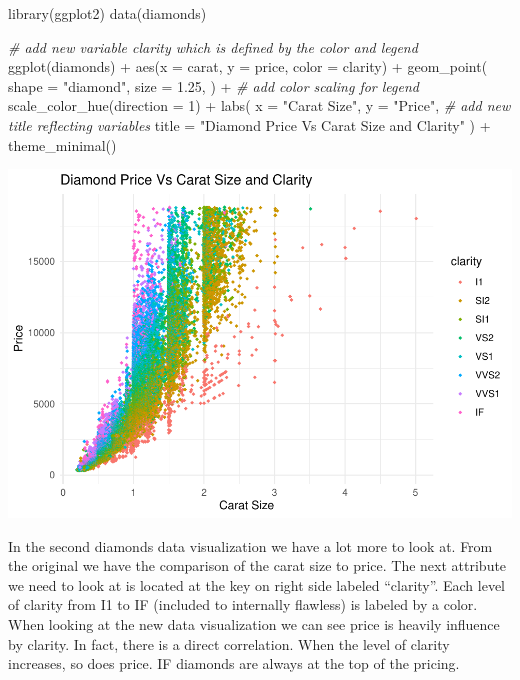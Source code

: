 \documentclass[
]{article}
\newenvironment{Shaded}{\begin{snugshade}}{\end{snugshade}}
\newcommand{\AttributeTok}[1]{\textcolor[rgb]{0.77,0.63,0.00}{#1}}
\newcommand{\CommentTok}[1]{\textcolor[rgb]{0.56,0.35,0.01}{\textit{#1}}}
\newcommand{\DecValTok}[1]{\textcolor[rgb]{0.00,0.00,0.81}{#1}}
\newcommand{\FloatTok}[1]{\textcolor[rgb]{0.00,0.00,0.81}{#1}}
\newcommand{\FunctionTok}[1]{\textcolor[rgb]{0.00,0.00,0.00}{#1}}
\newcommand{\NormalTok}[1]{#1}
\newcommand{\SpecialCharTok}[1]{\textcolor[rgb]{0.00,0.00,0.00}{#1}}
\newcommand{\StringTok}[1]{\textcolor[rgb]{0.31,0.60,0.02}{#1}}
\begin{document}
\begin{Shaded}
\begin{Highlighting}[]
\FunctionTok{library}\NormalTok{(ggplot2)}
\FunctionTok{data}\NormalTok{(diamonds)}

\CommentTok{\# add new variable \textquotesingle{}clarity\textquotesingle{} which is defined by the color and legend}
\FunctionTok{ggplot}\NormalTok{(diamonds) }\SpecialCharTok{+}
  \FunctionTok{aes}\NormalTok{(}\AttributeTok{x =}\NormalTok{ carat, }\AttributeTok{y =}\NormalTok{ price, }\AttributeTok{color =}\NormalTok{ clarity) }\SpecialCharTok{+}
  \FunctionTok{geom\_point}\NormalTok{(}
    \AttributeTok{shape =} \StringTok{"diamond"}\NormalTok{,}
    \AttributeTok{size =} \FloatTok{1.25}\NormalTok{,}
\NormalTok{  ) }\SpecialCharTok{+} 
  \CommentTok{\# add color scaling for legend }
  \FunctionTok{scale\_color\_hue}\NormalTok{(}\AttributeTok{direction =} \DecValTok{1}\NormalTok{) }\SpecialCharTok{+}
  \FunctionTok{labs}\NormalTok{(}
    \AttributeTok{x =} \StringTok{"Carat Size"}\NormalTok{,}
    \AttributeTok{y =} \StringTok{"Price"}\NormalTok{,}
    \CommentTok{\# add new title reflecting variables }
    \AttributeTok{title =} \StringTok{"Diamond Price Vs Carat Size and Clarity"}
\NormalTok{  ) }\SpecialCharTok{+}
  \FunctionTok{theme\_minimal}\NormalTok{() }
\end{Highlighting}
\end{Shaded}

\includegraphics{Activity-8-_files/figure-latex/Diamonds - Price vs Carat Size and Clarity-1.pdf}

In the second diamonds data visualization we have a lot more to look at.
From the original we have the comparison of the carat size to price. The
next attribute we need to look at is located at the key on right side
labeled ``clarity''. Each level of clarity from I1 to IF (included to
internally flawless) is labeled by a color. When looking at the new data
visualization we can see price is heavily influence by clarity. In fact,
there is a direct correlation. When the level of clarity increases, so
does price. IF diamonds are always at the top of the pricing.
\end{document}
